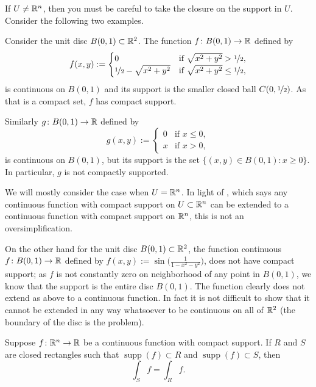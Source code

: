 If $U \not= {\mathbb{R}}^n$, then you must be careful to
take the closure on the support in $U$.  Consider the following
two examples.

\begin{example}
Consider the unit disc $B(0,1) \subset {\mathbb{R}}^2$.
The function $f \colon B(0,1) \to {\mathbb{R}}$ defined by
\begin{equation*}
f(x,y) :=
\begin{cases}
0 & \text{if $\sqrt{x^2+y^2} > \nicefrac{1}{2}$}, \\
\nicefrac{1}{2} - \sqrt{x^2+y^2} & \text{if $\sqrt{x^2+y^2} \leq \nicefrac{1}{2}$},
\end{cases}
\end{equation*}
is continuous on $B(0,1)$ and its support is the smaller closed ball
$C(0,\nicefrac{1}{2})$.  As that is a compact set, $f$ has compact support.

Similarly $g \colon B(0,1) \to {\mathbb{R}}$ defined by
\begin{equation*}
g(x,y) :=
\begin{cases}
0 & \text{if $x \leq 0$}, \\
x & \text{if $x > 0$},
\end{cases}
\end{equation*}
is continuous on $B(0,1)$, but its support is the set
$\{ (x,y) \in B(0,1) : x \geq 0 \}$.  In particular, $g$ is not compactly
supported.
\end{example}

We will mostly consider the case when $U={\mathbb{R}}^n$.  In light of
, which says any continuous
function with compact support on $U \subset {\mathbb{R}}^n$ can be extended to a
continuous function with compact support on ${\mathbb{R}}^n$,
this is not an oversimplification.

\begin{example}
On the other hand for the unit disc $B(0,1) \subset {\mathbb{R}}^2$,
the function continuous $f \colon B(0,1) \to {\mathbb{R}}$ defined by $f(x,y) :=
\sin\bigl(\frac{1}{1-x^2-y^2}\bigr)$, does not have compact support; as
$f$ is not constantly zero on neighborhood of any point in $B(0,1)$,
we know that the support is the entire disc $B(0,1)$.  The function clearly
does not extend as above to a continuous function.  In fact it is not
difficult to show that it cannot be extended in any way whatsoever to be
continuous on all of ${\mathbb{R}}^2$ (the boundary of the disc is the problem).
\end{example}

\begin{prop} \label{mv:prop:rectanglessupp}
Suppose $f \colon {\mathbb{R}}^n \to {\mathbb{R}}$ be a continuous function with compact support.
If $R$ and $S$ are closed rectangles such that
$\operatorname{supp}(f) \subset R$
and
$\operatorname{supp}(f) \subset S$, then
\begin{equation*}
\int_S f = \int_R f .
\end{equation*}
\end{prop}

